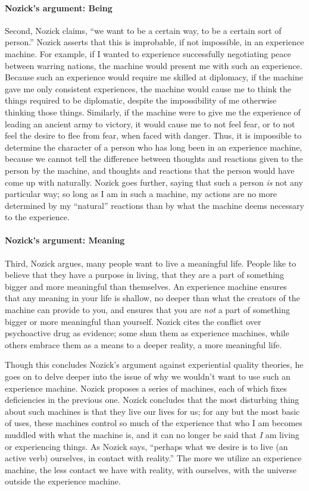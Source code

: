 \documentclass[letterpaper,11pt,twoside]{article}
\begin{document}
    \paragraph{Nozick's argument: Being} 
      Second, Nozick claims, ``we want to be a certain way, to be a certain sort of person.''  Nozick asserts that this is improbable, if not impossible, in an experience machine.  For example, if I wanted to experience successfully negotiating peace between warring nations, the machine would present me with such an experience.  Because such an experience would require me skilled at diplomacy, if the machine gave me only consistent experiences, the machine would cause me to think the things required to be diplomatic, despite the impossibility of me otherwise thinking those things.  Similarly, if the machine were to give me the experience of leading an ancient army to victory, it would cause me to not feel fear, or to not feel the desire to flee from fear, when faced with danger.  Thus, it is impossible to determine the character of a person who has long been in an experience machine, because we cannot tell the difference between thoughts and reactions given to the person by the machine, and thoughts and reactions that the person would have come up with naturally.  Nozick goes further, saying that such a person \emph{is} not any particular way; so long as I am in such a machine, my actions are no more determined by my ``natural'' reactions than by what the machine deems necessary to the experience.

    \paragraph{Nozick's argument: Meaning}
      Third, Nozick argues, many people want to live a meaningful life.  People like to believe that they have a purpose in living, that they are a part of something bigger and more meaningful than themselves.  An experience machine ensures that any meaning in your life is shallow, no deeper than what the creators of the machine can provide to you, and ensures that you are \emph{not} a part of something bigger or more meaningful than yourself.  Nozick cites the conflict over psychoactive drug as evidence; some shun them as experience machines, while others embrace them as a means to a deeper reality, a more meaningful life.

    Though this concludes Nozick's argument against experiential quality theories, he goes on to delve deeper into the issue of why we wouldn't want to use such an experience machine.  Nozick proposes a series of machines, each of which fixes deficiencies in the previous one.  Nozick concludes that the most disturbing thing about such machines is that they live our lives for us; for any but the most basic of uses, these machines control so much of the experience that who I am becomes muddled with what the machine is, and it can no longer be said that \emph{I} am living or experiencing things.  As Nozick says, ``perhaps what we desire is to live (an active verb) ourselves, in contact with reality.''  The more we utilize an experience machine, the less contact we have with reality, with ourselves, with the universe outside the experience machine.
\end{document}
